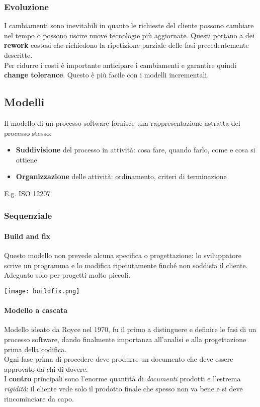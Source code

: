 \subsubsection{Evoluzione}
I cambiamenti sono inevitabili in quanto le richieste del cliente possono cambiare nel tempo o possono uscire nuove tecnologie più aggiornate. Questi portano a dei \textbf{rework} costosi che richiedono la ripetizione parziale delle fasi precedentemente descritte.\\
Per ridurre i costi è importante anticipare i cambiamenti e garantire quindi \textbf{change tolerance}. Questo è più facile con i modelli incrementali.

\subsection{Modelli}
\begin{definition}[Modello]
	Il modello di un processo software fornisce una rappresentazione astratta del processo stesso:
	\begin{itemize}
		\item \textbf{Suddivisione} del processo in attività: cosa fare, quando farlo, come e cosa si ottiene
		\item \textbf{Organizzazione} delle attività: ordinamento, criteri di terminazione
	\end{itemize}
	E.g. ISO 12207
\end{definition}

\subsubsection{Sequenziale}
\paragraph{Build and fix}
Questo modello non prevede alcuna specifica o progettazione: lo sviluppatore scrive un programma e lo modifica ripetutamente finché non soddisfa il cliente. Adeguato solo per progetti molto piccoli.
\begin{center}
	\texttt{[image: buildfix.png]}
\end{center}

\paragraph{Modello a cascata}
Modello ideato da Royce nel 1970, fu il primo a distinguere e definire le fasi di un processo software, dando finalmente importanza all'analisi e alla progettazione prima della codifica.\\
Ogni fase prima di procedere deve produrre un documento che deve essere approvato da chi di dovere.\\
I \textbf{contro} principali sono l'enorme quantità di \textit{documenti} prodotti e l'estrema \textit{rigidità}: il cliente vede solo il prodotto finale che spesso non va bene e si deve rincominciare da capo.

